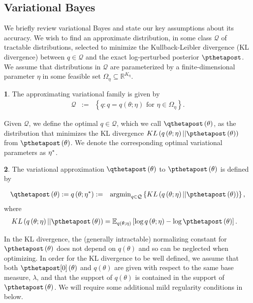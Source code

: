 \documentclass{article}\usepackage[]{graphicx}\usepackage[]{color}
\theoremstyle{definition}
\newtheorem{defn}{\protect\definitionname}
\theoremstyle{plain}
\theoremstyle{plain}
\theoremstyle{plain}
\theoremstyle{definition}
\theoremstyle{plain}
\theoremstyle{plain}
\providecommand{\definitionname}{Definition}
\begin{document}
\subsection{Variational Bayes\label{subsec:variational_Bayes}}

We briefly review variational Bayes and state our key assumptions about its
accuracy. We wish to find an approximate distribution, in some class
$\mathcal{Q}$ of tractable distributions, selected to minimize the
Kullback-Leibler divergence (KL divergence) between $q\in\mathcal{Q}$ and the
exact log-perturbed posterior $\pthetapost$. We assume that distributions in
$\mathcal{Q}$ are parameterized by a finite-dimensional parameter $\eta$ in some
feasible set $\Omega_{\eta}\subseteq\mathbb{R}^{K_{\eta}}$.
\begin{defn}
The approximating variational family is given by
\begin{eqnarray}
\mathcal{Q} & := & \left\{ q:q=q\left(\theta;\eta\right)\textrm{ for }
    \eta\in\Omega_{\eta}\right\} .\label{eq:q_approximating_family}
\end{eqnarray}
\end{defn}
Given $\mathcal{Q}$, we define the optimal $q\in\mathcal{Q}$, which
we call $\qthetapost\left(\theta\right)$, as the distribution that minimizes the KL
divergence $KL\left(q\left(\theta;\eta\right)||\pthetapost\left(\theta\right)\right)$
from $\pthetapost\left(\theta\right)$. We denote the corresponding optimal variational
parameters as $\eta^{*}$.
\begin{defn}
\label{def:kl_divergence}The variational approximation $\qthetapost\left(\theta\right)$
to $\pthetapost\left(\theta\right)$ is defined by

\begin{eqnarray}
\qthetapost\left(\theta\right) := q\left(\theta;\etaopt\right) & := &
    \textrm{argmin}_{q\in\mathcal{Q}}\left\{
        KL\left(q\left(\theta;\eta\right)||\pthetapost\left(\theta\right)\right)\right\},
\label{eq:kl_divergence}
\end{eqnarray}
where
\begin{align*}
KL\left(q\left(\theta;\eta\right)||\pthetapost\left(\theta\right)\right) &
    = \mbe_{q\left(\theta;\eta\right)}
        \left[\log q\left(\theta;\eta\right) - \log \pthetapost\left(\theta\right)
        \right].
\end{align*}
\end{defn}
In the KL divergence, the (generally intractable) normalizing constant for
$\pthetapost\left(\theta\right)$ does not depend on $q\left(\theta\right)$
and so can be neglected when optimizing. In order for
the KL divergence to be well defined, we assume that both
$\pzeropost\left(\theta\right)$
and $q\left(\theta\right)$ are given with respect to the same base
measure, $\lambda$, and that the support of $q\left(\theta\right)$
is contained in the support of $\pthetapost\left(\theta\right)$.
We will require some additional mild regularity conditions in
 below.
\end{document}
